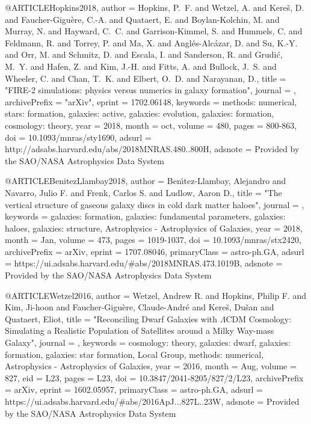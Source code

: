 @ARTICLE{Hopkins2018,
   author = {{Hopkins}, P.~F. and {Wetzel}, A. and {Kere{\v s}}, D. and {Faucher-Gigu{\`e}re}, C.-A. and 
	{Quataert}, E. and {Boylan-Kolchin}, M. and {Murray}, N. and 
	{Hayward}, C.~C. and {Garrison-Kimmel}, S. and {Hummels}, C. and 
	{Feldmann}, R. and {Torrey}, P. and {Ma}, X. and {Angl{\'e}s-Alc{\'a}zar}, D. and 
	{Su}, K.-Y. and {Orr}, M. and {Schmitz}, D. and {Escala}, I. and 
	{Sanderson}, R. and {Grudi{\'c}}, M.~Y. and {Hafen}, Z. and 
	{Kim}, J.-H. and {Fitts}, A. and {Bullock}, J.~S. and {Wheeler}, C. and 
	{Chan}, T.~K. and {Elbert}, O.~D. and {Narayanan}, D.},
    title = "{FIRE-2 simulations: physics versus numerics in galaxy formation}",
  journal = {\mnras},
archivePrefix = "arXiv",
   eprint = {1702.06148},
 keywords = {methods: numerical, stars: formation, galaxies: active, galaxies: evolution, galaxies: formation, cosmology: theory},
     year = 2018,
    month = oct,
   volume = 480,
    pages = {800-863},
      doi = {10.1093/mnras/sty1690},
   adsurl = {http://adsabs.harvard.edu/abs/2018MNRAS.480..800H},
  adsnote = {Provided by the SAO/NASA Astrophysics Data System}
}

@ARTICLE{BenitezLlambay2018,
       author = {{Ben{\'\i}tez-Llambay}, Alejandro and {Navarro}, Julio F. and {Frenk},
        Carlos S. and {Ludlow}, Aaron D.},
        title = "{The vertical structure of gaseous galaxy discs in cold dark matter haloes}",
      journal = {\mnras},
     keywords = {galaxies: formation, galaxies: fundamental parameters, galaxies: haloes, galaxies: structure, Astrophysics - Astrophysics of Galaxies},
         year = 2018,
        month = Jan,
       volume = {473},
        pages = {1019-1037},
          doi = {10.1093/mnras/stx2420},
archivePrefix = {arXiv},
       eprint = {1707.08046},
 primaryClass = {astro-ph.GA},
       adsurl = {https://ui.adsabs.harvard.edu/\#abs/2018MNRAS.473.1019B},
      adsnote = {Provided by the SAO/NASA Astrophysics Data System}
}

@ARTICLE{Wetzel2016,
       author = {{Wetzel}, Andrew R. and {Hopkins}, Philip F. and {Kim}, Ji-hoon and
        {Faucher-Gigu{\`e}re}, Claude-Andr{\'e} and {Kere{\v{s}}},
        Du{\v{s}}an and {Quataert}, Eliot},
        title = "{Reconciling Dwarf Galaxies with {\ensuremath{\Lambda}}CDM Cosmology: Simulating a Realistic Population of Satellites around a Milky Way-mass Galaxy}",
      journal = {\apj},
     keywords = {cosmology: theory, galaxies: dwarf, galaxies: formation, galaxies: star formation, Local Group, methods: numerical, Astrophysics - Astrophysics of Galaxies},
         year = 2016,
        month = Aug,
       volume = {827},
          eid = {L23},
        pages = {L23},
          doi = {10.3847/2041-8205/827/2/L23},
archivePrefix = {arXiv},
       eprint = {1602.05957},
 primaryClass = {astro-ph.GA},
       adsurl = {https://ui.adsabs.harvard.edu/\#abs/2016ApJ...827L..23W},
      adsnote = {Provided by the SAO/NASA Astrophysics Data System}
}

